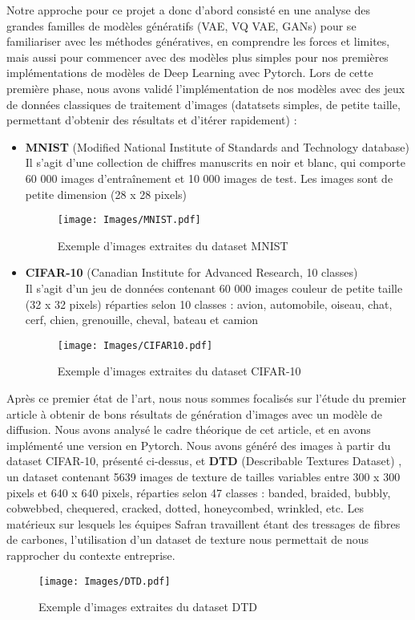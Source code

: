 \documentclass{article}
\begin{document}
Notre approche pour ce projet a donc d'abord consisté en une analyse des grandes familles de modèles génératifs (VAE, VQ VAE, GANs) pour se familiariser avec les méthodes génératives, en comprendre les forces et limites, mais aussi pour 
commencer avec des modèles plus simples pour nos premières implémentations de modèles de Deep Learning avec Pytorch. Lors de cette première phase, nous avons validé l'implémentation de nos modèles avec des jeux de données classiques de traitement d'images (datatsets simples, de petite taille, permettant d'obtenir des résultats et d'itérer rapidement) :
\begin{itemize}
    \item \textbf{MNIST} (Modified National Institute of Standards and Technology database) \cite{MNIST}\\
    Il s'agit d'une collection de chiffres manuscrits en noir et blanc, qui comporte 60 000 images d'entraînement et 10 000 images de test. Les images sont de petite dimension (28 x 28 pixels)
    \begin{figure}[H]
        \centering
        \texttt{[image: Images/MNIST.pdf]}
        \caption{Exemple d'images extraites du dataset MNIST}
    \end{figure}
    \item \textbf{CIFAR-10} (Canadian Institute for Advanced Research, 10 classes) \cite{CIFAR10}\\
    Il s'agit d'un jeu de données contenant 60 000 images couleur de petite taille (32 x 32  pixels) réparties selon 10 classes : avion, automobile, oiseau, chat, cerf, chien, grenouille, cheval, bateau et camion
    \begin{figure}[H]
        \centering
        \texttt{[image: Images/CIFAR10.pdf]}
        \caption{Exemple d'images extraites du dataset CIFAR-10}
    \end{figure}
\end{itemize}

Après ce premier état de l'art, nous nous sommes focalisés sur l'étude du premier article à obtenir de bons résultats de génération d'images avec un modèle de diffusion. Nous avons analysé le cadre théorique de cet article, et en avons implémenté une version en Pytorch. Nous avons généré des images à partir du dataset CIFAR-10, présenté ci-dessus, et \textbf{DTD} (Describable Textures Dataset) \cite{DTD}, un dataset contenant 5639 images de texture de tailles variables entre 300 x 300 pixels et 640 x 640 pixels, réparties selon 47 classes : banded, braided, bubbly, cobwebbed, chequered, cracked, dotted, honeycombed, wrinkled, etc. Les matérieux sur lesquels les équipes Safran travaillent étant des tressages de fibres de carbones, l'utilisation d'un dataset de texture nous permettait de nous rapprocher du contexte entreprise.
\begin{figure}[H]
    \centering
    \texttt{[image: Images/DTD.pdf]}
    \caption{Exemple d'images extraites du dataset DTD}
\end{figure}
\end{document}
